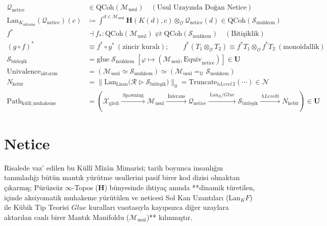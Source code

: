 \documentclass[11pt, a4paper]{article}
\begin{document}
\begin{align}
\mathcal{Q}_{\text{netice}} &\in \text{QCoh}(\mathcal{M}_{\text{usul}}) \quad (\text{Usul Uzayında Doğan Netice}) \\
\text{Lan}_{K_{\text{aktarım}}}(\mathcal{Q}_{\text{netice}})(c) &\coloneqq \int^{d \in \mathcal{M}_{\text{usul}}} \mathbf{H}(K(d), c) \otimes_{\mathcal{O}} \mathcal{Q}_{\text{netice}}(d) \in \text{QCoh}(\mathcal{S}_{\text{muhkem}}) \\
f^* &\dashv f_* : \text{QCoh}(\mathcal{M}_{\text{usul}}) \rightleftarrows \text{QCoh}(\mathcal{S}_{\text{muhkem}}) \quad (\text{Bitişiklik}) \\
(g \circ f)^* &\equiv f^* \circ g^* \ (\text{zincir kuralı}); \qquad f^*(T_1 \otimes_{\mathcal{O}} T_2) \equiv f^* T_1 \otimes_{\mathcal{O}} f^* T_2 \ (\text{monoidallik}) \\
\mathcal{S}_{\text{birleşik}} &= \text{glue} \; \mathcal{S}_{\text{muhkem}} \; \left[ \varphi \mapsto (\mathcal{M}_{\text{usul}}, \text{Equiv}_{\text{netice}}) \right] \in \mathbf{U} \\
\text{Univalence}_{\text{aktarım}} &= (\mathcal{M}_{\text{usul}} \simeq \mathcal{S}_{\text{muhkem}}) \simeq (\mathcal{M}_{\text{usul}} =_{\mathcal{U}} \mathcal{S}_{\text{muhkem}}) \\
N_{\text{kebîr}} &= \big\| \text{Lan}_{\text{Lisan}} \big( \mathcal{R} \triangleright \mathcal{S}_{\text{birleşik}} \big) \big\|_0 = \text{Truncate}_{hLevel\,2}(\cdots) \in \mathcal{N} \\
\text{Path}_{\text{küllî\_muhakeme}} &= \left( \mathcal{X}_{\text{girdi}} \xrightarrow{\;\text{Spawning}\;} \mathcal{M}_{\text{usul}} \xrightarrow{\;\text{İnferans}\;} \mathcal{Q}_{\text{netice}} \xrightarrow{\;\text{Lan}_K / Glue\;} \mathcal{S}_{\text{birleşik}} \xrightarrow{\;hLevel 0\;} N_{\text{kebîr}} \right) \in \mathbf{U}
\end{align}

\section{Netice}

Risalede vaz' edilen bu Küllî Mîzân Mimarisi; tarih boyunca insanlığın tanımladığı bütün mantık yürütme usullerini pasif birer kod dizisi olmaktan çıkarmış; Pürüzsüz $\infty$-Topos ($\mathbf{H}$) bünyesinde ihtiyaç anında **dinamik türetilen, içinde aksiyomatik muhakeme yürütülen ve neticesi Sol Kan Uzantıları ($\text{Lan}_K F$) ile Kübik Tip Teorisi $Glue$ kuralları vasıtasıyla kayıpsızca diğer uzaylara aktarılan canlı birer Mantık Manifoldu ($\mathcal{M}_{\text{usul}}$)** kılınmıştır.
\end{document}
